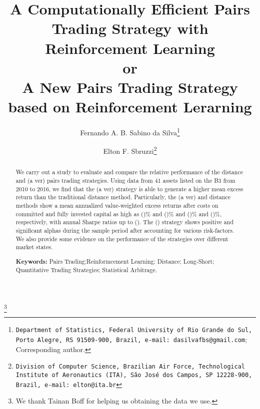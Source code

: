 \documentclass[a4paper,10t]{article}
\begin{document}
	
	\title{A Computationally Efficient Pairs Trading Strategy with Reinforcement Learning \\ or \\ A New Pairs Trading Strategy based on Reinforcement Lerarning}
	\author[]{ Fernando A. B. Sabino da Silva\thanks{\texttt{Department of Statistics, Federal University of Rio Grande do Sul, Porto Alegre, RS 91509-900, Brazil, e-mail: dasilvafbs@gmail.com}; Corresponding author.}}
	\author[]{Elton F. Sbruzzi\thanks{\texttt{Division of Computer Science, Brazilian Air Force, Technological Institute of Aeronautics (ITA), São José dos Campos, SP 12228-900, Brazil, e-mail: elton@ita.br}}}
	\thanks{We thank Tainan Boff for helping us obtaining the data we use.}
	\affil[]{}
	\date{}
	\maketitle
	
	
	\begin{abstract}
		We carry out a study to evaluate and compare the relative performance of the distance and (a ver) pairs trading strategies. Using data from 41 assets listed on the B3 from 2010 to 2016, we find that the (a ver) strategy is able to generate a higher mean excess return than the traditional distance method. Particularly, the (a ver) and distance methods show a mean annualized value-weighted excess returns after costs on committed and fully invested capital as high as ()\% and ()\% and ()\% and ()\%, respectively, with annual Sharpe ratios up to (). The () strategy shows positive and significant alphas during the sample period after accounting for various risk-factors. We also provide some evidence on the performance of the strategies over different market states. 
		
		\smallskip
		
		\noindent \textbf{Keywords:} Pairs Trading;Reinformcement Learning; Distance; Long-Short; Quantitative Trading Strategies; Statistical Arbitrage.
	\end{abstract}
	
	
	
	
	
	
	
	
	
	
	
		
	
	
	

	
\end{document}

